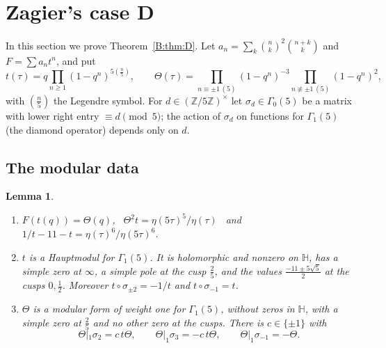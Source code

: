 \documentclass[11pt,a4paper]{article}
\newtheorem{lemma}[theorem]{Lemma}
\theoremstyle{definition}\newtheorem{definition}[theorem]{Definition}
\theoremstyle{remark}\newtheorem{remark}[theorem]{Remark}
\newcommand{\Z}{\mathbb Z}
\newcommand{\Hb}{\mathbb H}
\numberwithin{equation}{section}
\begin{document}
\section{Zagier's case D}\label{B:source-main-7}\label{B:sec:D}

In this section we prove Theorem~\ref{B:thm:D}. Let $a_n=\sum_k\binom nk^2\binom{n+k}k$ and $F=\sum a_nt^n$, and put
\[
t(\tau)=q\prod_{n\ge1}(1-q^n)^{5(\frac n5)},\qquad
\Theta(\tau)=\prod_{n\equiv\pm1\,(5)}(1-q^n)^{-3}\prod_{n\not\equiv\pm1\,(5)}(1-q^n)^{2},
\]
with $(\frac n5)$ the Legendre symbol. For $d\in(\Z/5\Z)^\times$ let $\sigma_d\in\Gamma_0(5)$ be a matrix with lower right
entry $\equiv d\pmod5$; the action of $\sigma_d$ on functions for $\Gamma_1(5)$ (the diamond operator) depends only on $d$.

\subsection{The modular data}
\begin{lemma}\label{B:lem:Ddata}
\begin{enumerate}[label=\textup{(\alph*)}]
\item $F(t(q))=\Theta(q)$, \ $\Theta^2t=\eta(5\tau)^5/\eta(\tau)$ \ and \ $1/t-11-t=\eta(\tau)^6/\eta(5\tau)^6$.
\item $t$ is a Hauptmodul for $\Gamma_1(5)$. It is holomorphic and nonzero on $\Hb$, has a simple zero at $\infty$, a simple
pole at the cusp $\frac25$, and the values $\frac{-11\pm5\sqrt5}2$ at the cusps $0,\frac12$. Moreover
$t\circ\sigma_{\pm2}=-1/t$ and $t\circ\sigma_{-1}=t$.
\item $\Theta$ is a modular form of weight one for $\Gamma_1(5)$, without zeros in $\Hb$, with a simple zero at $\frac25$
and no other zero at the cusps. There is $c\in\{\pm1\}$ with
\[
\Theta|_1\sigma_2=c\,t\Theta,\qquad \Theta|_1\sigma_3=-c\,t\Theta,\qquad \Theta|_1\sigma_{-1}=-\Theta .
\]
\end{enumerate}
\end{lemma}
\end{document}
